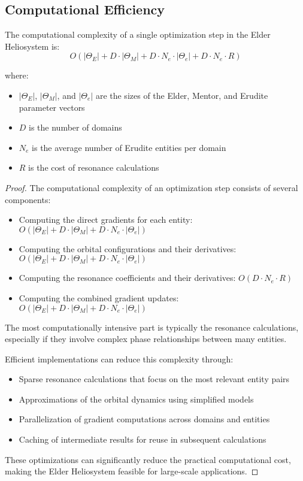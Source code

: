 \subsection{Computational Efficiency}

\begin{theorem}
The computational complexity of a single optimization step in the Elder Heliosystem is:
\begin{equation}
O(|\Theta_E| + D \cdot |\Theta_M| + D \cdot N_e \cdot |\Theta_e| + D \cdot N_e \cdot R)
\end{equation}

where:
\begin{itemize}
    \item $|\Theta_E|$, $|\Theta_M|$, and $|\Theta_e|$ are the sizes of the Elder, Mentor, and Erudite parameter vectors
    \item $D$ is the number of domains
    \item $N_e$ is the average number of Erudite entities per domain
    \item $R$ is the cost of resonance calculations
\end{itemize}
\end{theorem}

\begin{proof}
The computational complexity of an optimization step consists of several components:
\begin{itemize}
    \item Computing the direct gradients for each entity: $O(|\Theta_E| + D \cdot |\Theta_M| + D \cdot N_e \cdot |\Theta_e|)$
    \item Computing the orbital configurations and their derivatives: $O(|\Theta_E| + D \cdot |\Theta_M| + D \cdot N_e \cdot |\Theta_e|)$
    \item Computing the resonance coefficients and their derivatives: $O(D \cdot N_e \cdot R)$
    \item Computing the combined gradient updates: $O(|\Theta_E| + D \cdot |\Theta_M| + D \cdot N_e \cdot |\Theta_e|)$
\end{itemize}

The most computationally intensive part is typically the resonance calculations, especially if they involve complex phase relationships between many entities.

Efficient implementations can reduce this complexity through:
\begin{itemize}
    \item Sparse resonance calculations that focus on the most relevant entity pairs
    \item Approximations of the orbital dynamics using simplified models
    \item Parallelization of gradient computations across domains and entities
    \item Caching of intermediate results for reuse in subsequent calculations
\end{itemize}

These optimizations can significantly reduce the practical computational cost, making the Elder Heliosystem feasible for large-scale applications.
\end{proof}

